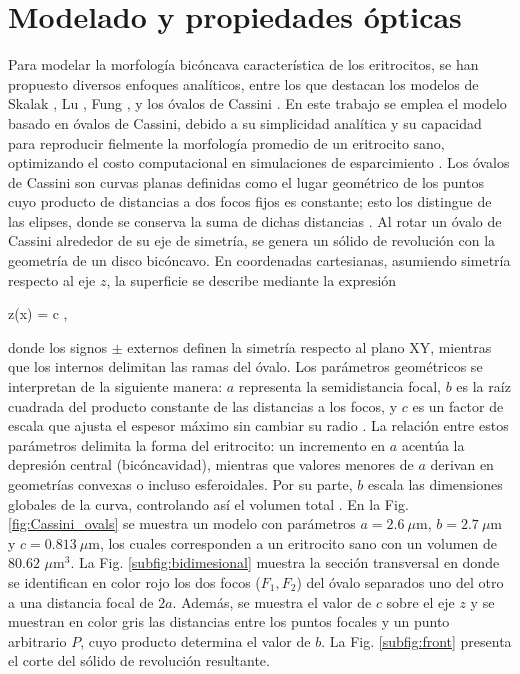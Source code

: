 \section{Modelado y propiedades ópticas}
\label{section:optical_properties}

Para modelar la morfología bicóncava característica de los eritrocitos, se han propuesto diversos enfoques analíticos, entre los que destacan los modelos de Skalak \cite{skalakStrainEnergyFunction1973}, Lu \cite{luSimulationsLightScattering2005}, Fung \cite{fungHighresolutionDataGeometry1981},
 y los óvalos de Cassini \cite{ereminaDifferentShapeModels2006}. En este trabajo se emplea el modelo basado en óvalos de Cassini, debido a su simplicidad analítica y su capacidad para reproducir fielmente la morfología promedio de un eritrocito sano, optimizando el costo computacional en simulaciones de esparcimiento \cite{ereminaDifferentShapeModels2006}. Los óvalos de Cassini son curvas planas definidas como el lugar geométrico de los puntos cuyo producto de distancias a dos focos fijos es constante; esto los distingue de las elipses, donde se conserva la suma de dichas distancias \cite{wriedtLightScatteringSingle2006}. Al rotar un óvalo de Cassini alrededor de su eje de simetría, se genera un sólido de revolución con la geometría de un disco bicóncavo. En coordenadas cartesianas, asumiendo simetría respecto al eje $z$, la superficie se describe mediante la expresión \cite{ereminaDifferentShapeModels2006}
 \begin{tcolorbox}
 	z(x) = \pm c ,
 	\label{eq:cassini}
 \end{tcolorbox}
\noindent donde los signos $\pm$ externos definen la simetría respecto al plano XY, mientras que los internos delimitan las ramas del óvalo. Los parámetros geométricos se interpretan de la siguiente manera: $a$ representa la semidistancia focal, $b$ es la raíz cuadrada del producto constante de las distancias a los focos, y $c$ es un factor de escala que ajusta el espesor máximo sin cambiar su radio \cite{wriedtLightScatteringSingle2006}. La relación entre estos parámetros delimita la forma del eritrocito: un incremento en $a$ acentúa la depresión central (bicóncavidad), mientras que valores menores de $a$ derivan en geometrías convexas o incluso esferoidales. Por su parte, $b$ escala las dimensiones globales de la curva, controlando así el volumen total \cite{ereminaDifferentShapeModels2006}. En la Fig. \ref{fig:Cassini_ovals} se muestra un modelo con parámetros $a=2.6~\mu$m, $b=2.7~\mu$m y $c=0.813~\mu$m, los cuales corresponden a un eritrocito sano con un volumen de $80.62$ $\mu$m$^3$. La Fig. \ref{subfig:bidimesional} muestra la sección transversal en donde se identifican en color rojo los dos focos ($F_1,F_2$) del óvalo separados uno del otro a una distancia focal de $2a$. Además, se muestra el valor de $c$ sobre el eje $z$ y se muestran en color gris las distancias entre los puntos focales y un punto arbitrario $P$, cuyo producto determina el valor de $b$. La Fig. \ref{subfig:front} presenta el corte del sólido de revolución resultante.
